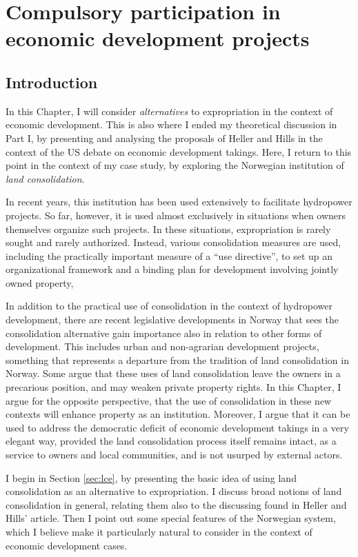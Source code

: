 \chapter{Compulsory participation in economic development projects}\label{chap:6}

\section{Introduction}\label{sec:intro6}

In this Chapter, I will consider {\it alternatives} to expropriation in the context of economic development. This is also where I ended my theoretical discussion in Part I, by presenting and analysing the proposals of Heller and Hills in the context of the US debate on economic development takings. Here, I return to this point in the context of my case study, by exploring the Norwegian institution of {\it land consolidation}. 

In recent years, this institution has been used extensively to facilitate hydropower projects. So far, however, it is used almost exclusively in situations when owners themselves organize such projects. In these situations, expropriation is rarely sought and rarely authorized. Instead, various consolidation measures are used, including the practically important measure of a ``use directive'', to set up an organizational framework and a binding plan for development involving jointly owned property,

In addition to the practical use of consolidation in the context of hydropower development, there are recent legislative developments in Norway that sees the consolidation alternative gain importance also in relation to other forms of development. This includes urban and non-agrarian development projects, something that represents a departure from the tradition of land consolidation in Norway. Some argue that these uses of land consolidation leave the owners in a precarious position, and may weaken private property rights. In this Chapter, I argue for the opposite perspective, that the use of consolidation in these new contexts will enhance property as an institution. Moreover, I argue that it can be used to  address the democratic deficit of economic development takings in a very elegant way, provided the land consolidation process itself remains intact, as a service to owners and local communities, and is not usurped by external actors.

I begin in Section \ref{sec:lce}, by presenting the basic idea of using land consolidation as an alternative to expropriation. I discuss broad notions of land consolidation in general, relating them also to the discussing found in Heller and Hills' article. Then I point out some special features of the Norwegian system, which I believe make it particularly natural to consider in the context of economic development cases. 

